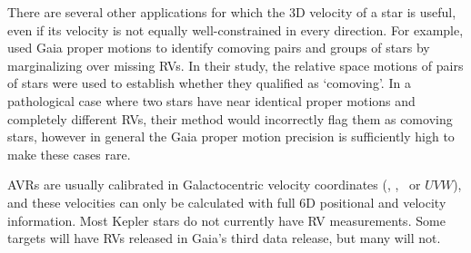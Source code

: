 There are several other applications for which the 3D velocity of a star is
useful, even if its velocity is not equally well-constrained in every
direction.
For example, \citet{oh2017} used Gaia proper motions to identify comoving
pairs and groups of stars by marginalizing over missing RVs.
In their study, the relative space motions of pairs of stars were used to
establish whether they qualified as `comoving'.
In a pathological case where two stars have near identical proper motions and
completely different RVs, their method would incorrectly flag them as comoving
stars, however in general the Gaia proper motion precision is sufficiently
high to make these cases rare.

AVRs are usually calibrated in Galactocentric velocity coordinates (\vx, \vy,
\vz\ or $UVW$), and these velocities can only be calculated with full 6D
positional and velocity information.
Most Kepler stars do not currently have RV measurements.
Some targets will have RVs released in Gaia's third data release, but many
will not.

